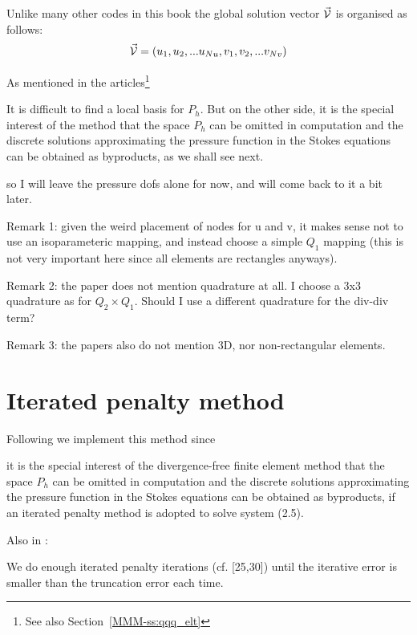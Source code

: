 Unlike many other codes in this book the global solution vector $\vec{\cal V}$ 
is organised as follows:
\[
\vec{\cal V} = ( u_1, u_2, ... u_{Nu}, v_1, v_2, ... v_{Nv})
\]

As mentioned in the articles\footnote{See also Section~\ref{MMM-ss:qqq_elt}}  
\begin{displayquote}
{\color{darkgray}
It is difficult to ﬁnd a
local basis for $P_h$. But on the other side, it is the special interest of the method that
the space $P_h$ can be omitted in computation and the discrete solutions approximating
the pressure function in the Stokes equations can be obtained as byproducts, as we
shall see next.}
\end{displayquote}
so I will leave the pressure dofs alone for now, and will come back to it a bit later.

Remark 1: given the weird placement of nodes for u and v, it makes sense not to 
use an isoparameteric mapping, and instead choose a simple $Q_1$ mapping (this 
is not very important here since all elements are rectangles anyways).

Remark 2: the paper does not mention quadrature at all. 
I choose a 3x3 quadrature as for $Q_2\times Q_1$. 
Should I use a different quadrature for the div-div term?

Remark 3: the papers also do not mention 3D, nor non-rectangular elements. 

\section*{Iterated penalty method}

Following \cite{zhan09,huzh11} we implement this method since

\begin{displayquote}
{\color{darkgray}
it is the special interest
of the divergence-free ﬁnite element method that the space $P_h$ can be omitted
in computation and the discrete solutions approximating the pressure function
in the Stokes equations can be obtained as byproducts, if an iterated penalty
method is adopted to solve system (2.5).}
\end{displayquote}

Also in \textcite{huzh11}:
\begin{displayquote}
{\color{darkgray}
We do enough iterated penalty iterations (cf. [25,30]) until the iterative error is smaller
than the truncation error each time.}
\end{displayquote}

